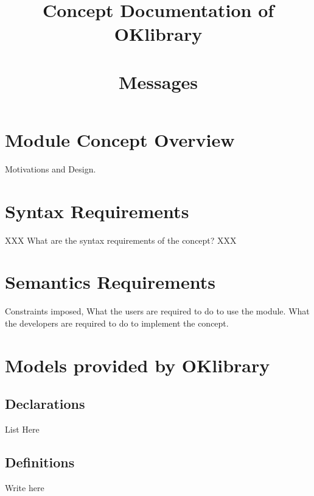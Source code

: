 \documentclass[11pt,a4paper]{article}
\title{Concept Documentation of OKlibrary \\~\\ Messages}
\begin{document}
\maketitle

\tableofcontents

\section{Module Concept Overview}
Motivations and Design. 

\section{Syntax Requirements}

XXX What are the syntax requirements of the concept? XXX

\section{Semantics Requirements}

Constraints imposed, What the users are required to do to use the module.
What the developers are required to do to implement the concept.

\section{Models provided by OKlibrary}

\subsection{Declarations}
List Here

\subsection{Definitions}
Write here
\end{document}
